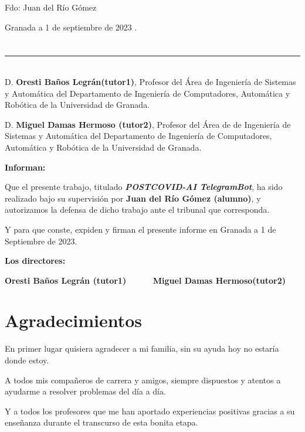 \noindent Fdo: Juan del Río Gómez


\vspace{2cm}

\begin{flushright}
Granada a 1 de septiembre de 2023 .
\end{flushright}


\chapter*{}
\thispagestyle{empty}

\noindent\rule[-1ex]{\textwidth}{2pt}\\[4.5ex]

D. \textbf{Oresti Baños Legrán(tutor1)}, Profesor del Área de Ingeniería de Sistemas y Automática del Departamento de Ingeniería de Computadores, Automática y Robótica de la Universidad de Granada.

\vspace{0.5cm}

D. \textbf{Miguel Damas Hermoso (tutor2)}, Profesor del Área de de Ingeniería de Sistemas y Automática del Departamento de Ingeniería de Computadores, Automática y Robótica de la Universidad de Granada.


\vspace{0.5cm}

\textbf{Informan:}

\vspace{0.5cm}

Que el presente trabajo, titulado \textit{\textbf{POSTCOVID-AI TelegramBot}},
ha sido realizado bajo su supervisión por \textbf{Juan del Río Gómez (alumno)}, y autorizamos la defensa de dicho trabajo ante el tribunal
que corresponda.

\vspace{0.5cm}

Y para que conste, expiden y firman el presente informe en Granada a 1 de Septiembre de 2023.

\vspace{1cm}

\textbf{Los directores:}

\vspace{5cm}

\noindent \textbf{Oresti Baños Legrán (tutor1) \ \ \ \ \ Miguel Damas Hermoso(tutor2)}

\chapter*{Agradecimientos}
\thispagestyle{empty}

       \vspace{1cm}

En primer lugar quisiera agradecer a mi familia, sin su ayuda hoy no estaría donde estoy.

A todos mis compañeros de carrera y amigos, siempre dispuestos y atentos a ayudarme a resolver problemas del día a día.

Y a todos los profesores que me han aportado experiencias positivas gracias a su enseñanza durante el transcurso de esta bonita etapa. 
    


